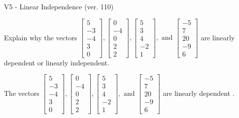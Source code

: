 \begin{exercise}
  \begin{exerciseTitle}V5 - Linear Independence (ver. 110)\end{exerciseTitle}
  \begin{exerciseStatement}
    Explain why the vectors \(\left[\begin{array}{r}
5 \\
-3 \\
-4 \\
3 \\
0
\end{array}\right] , \left[\begin{array}{r}
0 \\
-4 \\
0 \\
2 \\
2
\end{array}\right] , \left[\begin{array}{r}
5 \\
3 \\
4 \\
-2 \\
1
\end{array}\right] , \text{ and } \left[\begin{array}{r}
-5 \\
7 \\
20 \\
-9 \\
6
\end{array}\right]\) are linearly dependent or linearly independent.	


  \end{exerciseStatement}
  \begin{exerciseAnswer}
   The vectors \(\left[\begin{array}{r}
5 \\
-3 \\
-4 \\
3 \\
0
\end{array}\right] , \left[\begin{array}{r}
0 \\
-4 \\
0 \\
2 \\
2
\end{array}\right] , \left[\begin{array}{r}
5 \\
3 \\
4 \\
-2 \\
1
\end{array}\right] , \text{ and } \left[\begin{array}{r}
-5 \\
7 \\
20 \\
-9 \\
6
\end{array}\right]\) are 
  	 linearly dependent  .
  


  \end{exerciseAnswer}
\end{exercise}